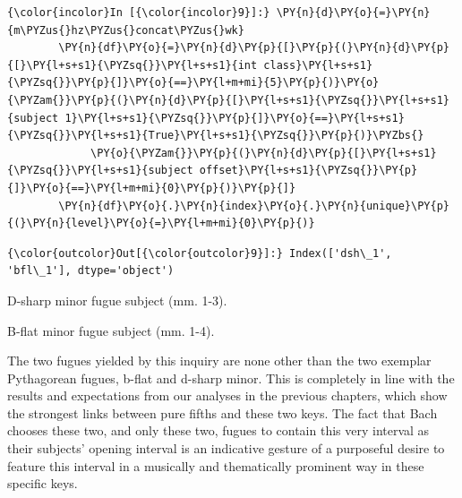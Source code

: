     \begin{Verbatim}[commandchars=\\\{\}]
{\color{incolor}In [{\color{incolor}9}]:} \PY{n}{d}\PY{o}{=}\PY{n}{m\PYZus{}hz\PYZus{}concat\PYZus{}wk}
        \PY{n}{df}\PY{o}{=}\PY{n}{d}\PY{p}{[}\PY{p}{(}\PY{n}{d}\PY{p}{[}\PY{l+s+s1}{\PYZsq{}}\PY{l+s+s1}{int class}\PY{l+s+s1}{\PYZsq{}}\PY{p}{]}\PY{o}{==}\PY{l+m+mi}{5}\PY{p}{)}\PY{o}{\PYZam{}}\PY{p}{(}\PY{n}{d}\PY{p}{[}\PY{l+s+s1}{\PYZsq{}}\PY{l+s+s1}{subject 1}\PY{l+s+s1}{\PYZsq{}}\PY{p}{]}\PY{o}{==}\PY{l+s+s1}{\PYZsq{}}\PY{l+s+s1}{True}\PY{l+s+s1}{\PYZsq{}}\PY{p}{)}\PYZbs{}
             \PY{o}{\PYZam{}}\PY{p}{(}\PY{n}{d}\PY{p}{[}\PY{l+s+s1}{\PYZsq{}}\PY{l+s+s1}{subject offset}\PY{l+s+s1}{\PYZsq{}}\PY{p}{]}\PY{o}{==}\PY{l+m+mi}{0}\PY{p}{)}\PY{p}{]}
        \PY{n}{df}\PY{o}{.}\PY{n}{index}\PY{o}{.}\PY{n}{unique}\PY{p}{(}\PY{n}{level}\PY{o}{=}\PY{l+m+mi}{0}\PY{p}{)}
\end{Verbatim}
\begin{Verbatim}[commandchars=\\\{\}]
{\color{outcolor}Out[{\color{outcolor}9}]:} Index(['dsh\_1', 'bfl\_1'], dtype='object')
\end{Verbatim}


\begin{Example}[H]
    \begin{center}
    \caption{ D-sharp minor fugue subject (mm. 1-3). }
    \end{center}
\end{Example}
    


\begin{Example}[H]
    \begin{center}
    \caption{ B-flat minor fugue subject (mm. 1-4). }
    \end{center}
\end{Example}
    
    The two fugues yielded by this inquiry are none other than the two
exemplar Pythagorean fugues, b-flat and d-sharp minor. This is
completely in line with the results and expectations from our analyses
in the previous chapters, which show the strongest links between pure
fifths and these two keys. The fact that Bach chooses these two, and
only these two, fugues to contain this very interval as their subjects'
opening interval is an indicative gesture of a purposeful desire to
feature this interval in a musically and thematically prominent way in
these specific keys.

